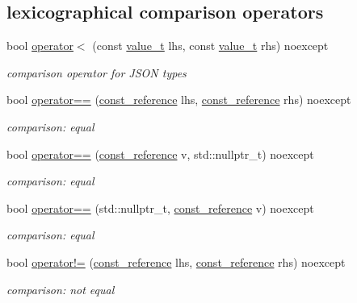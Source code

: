 \subsection*{lexicographical comparison operators}
\begin{DoxyCompactItemize}
\item 
bool \hyperlink{a00025_a24d7df0b5b41319dbab2713d3641faf7}{operator$<$} (const \hyperlink{a00025_a231b02148577b69a154b2ce2c87a5522}{value\+\_\+t} lhs, const \hyperlink{a00025_a231b02148577b69a154b2ce2c87a5522}{value\+\_\+t} rhs) noexcept
\begin{DoxyCompactList}\small\item\em comparison operator for J\+S\+ON types \end{DoxyCompactList}\item 
bool \hyperlink{a00025_a122640e7e2db1814fc7bbb3c122ec76e}{operator==} (\hyperlink{a00025_af677a29b0e66edc9f66e5167e4667071}{const\+\_\+reference} lhs, \hyperlink{a00025_af677a29b0e66edc9f66e5167e4667071}{const\+\_\+reference} rhs) noexcept
\begin{DoxyCompactList}\small\item\em comparison\+: equal \end{DoxyCompactList}\item 
bool \hyperlink{a00025_a9730b9f7bc2150e641fe20198d4477c7}{operator==} (\hyperlink{a00025_af677a29b0e66edc9f66e5167e4667071}{const\+\_\+reference} v, std\+::nullptr\+\_\+t) noexcept
\begin{DoxyCompactList}\small\item\em comparison\+: equal \end{DoxyCompactList}\item 
bool \hyperlink{a00025_a98e05a2c9b8f74bd60442772cddeee52}{operator==} (std\+::nullptr\+\_\+t, \hyperlink{a00025_af677a29b0e66edc9f66e5167e4667071}{const\+\_\+reference} v) noexcept
\begin{DoxyCompactList}\small\item\em comparison\+: equal \end{DoxyCompactList}\item 
bool \hyperlink{a00025_a6e2e21da48f5d9471716cd868a068327}{operator!=} (\hyperlink{a00025_af677a29b0e66edc9f66e5167e4667071}{const\+\_\+reference} lhs, \hyperlink{a00025_af677a29b0e66edc9f66e5167e4667071}{const\+\_\+reference} rhs) noexcept
\begin{DoxyCompactList}\small\item\em comparison\+: not equal \end{DoxyCompactList}\item 

\end{DoxyCompactItemize}
